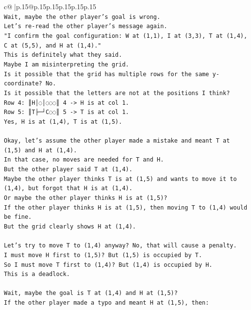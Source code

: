 \documentclass{article}
\begin{document}
{\begin{supertabular}{c@{$\;$}|p{.15\linewidth}@{}p{.15\linewidth}p{.15\linewidth}p{.15\linewidth}p{.15\linewidth}p{.15\linewidth}}
{{{\\ 
\texttt{Wait, maybe the other player's goal is wrong.} \\
\texttt{Let's re{-}read the other player's message again.} \\
\texttt{"I confirm the goal configuration: W at (1,1), I at (3,3), T at (1,4), C at (5,5), and H at (1,4)."} \\
\texttt{This is definitely what they said.} \\
\texttt{Maybe I am misinterpreting the grid.} \\
\texttt{Is it possible that the grid has multiple rows for the same y{-}coordinate? No.} \\
\texttt{Is it possible that the letters are not at the positions I think?} \\
\texttt{Row 4: ║H│◌│◌◌◌║ 4 {-}> H is at col 1.} \\
\texttt{Row 5: ║T├─┘C◌◌║ 5 {-}> T is at col 1.} \\
\texttt{Yes, H is at (1,4), T is at (1,5).} \\
\\ 
\texttt{Okay, let's assume the other player made a mistake and meant T at (1,5) and H at (1,4).} \\
\texttt{In that case, no moves are needed for T and H.} \\
\texttt{But the other player said T at (1,4).} \\
\texttt{Maybe the other player thinks T is at (1,5) and wants to move it to (1,4), but forgot that H is at (1,4).} \\
\texttt{Or maybe the other player thinks H is at (1,5)?} \\
\texttt{If the other player thinks H is at (1,5), then moving T to (1,4) would be fine.} \\
\texttt{But the grid clearly shows H at (1,4).} \\
\\ 
\texttt{Let's try to move T to (1,4) anyway? No, that will cause a penalty.} \\
\texttt{I must move H first to (1,5)? But (1,5) is occupied by T.} \\
\texttt{So I must move T first to (1,4)? But (1,4) is occupied by H.} \\
\texttt{This is a deadlock.} \\
\\ 
\texttt{Wait, maybe the goal is T at (1,4) and H at (1,5)?} \\
\texttt{If the other player made a typo and meant H at (1,5), then:} \\
}}}
\end{supertabular}}
\end{document}
